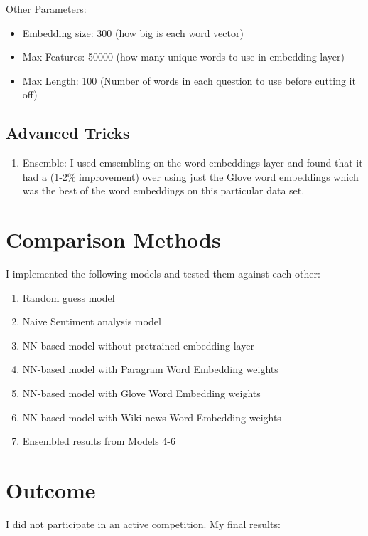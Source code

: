 \documentclass[11pt]{article}
\begin{document}
Other Parameters:

\begin{itemize}
\item Embedding size: 300 (how big is each word vector)
\item Max Features: 50000 (how many unique words to use in embedding layer)
\item Max Length: 100 (Number of words in each question to use before cutting it off)
\end{itemize}

\subsection{Advanced Tricks}
\label{sec:org7d4ab91}

\begin{enumerate}
\item Ensemble: I used emsembling on the word embeddings layer and found that it had a (1-2\% improvement) over using just the Glove word embeddings
which was the best of the word embeddings on this particular data set.
\end{enumerate}

\section{Comparison Methods}
\label{sec:orgdc150c3}


I implemented the following models and tested them against each other:

\begin{enumerate}
\item Random guess model
\item Naive Sentiment analysis model
\item NN-based model without pretrained embedding layer
\item NN-based model with Paragram Word Embedding weights
\item NN-based model with Glove Word Embedding weights
\item NN-based model with Wiki-news Word Embedding weights
\item Ensembled results from Models 4-6
\end{enumerate}


\section{Outcome}
\label{sec:org9862f01}

I did not participate in an active competition. My final results:
\end{document}
